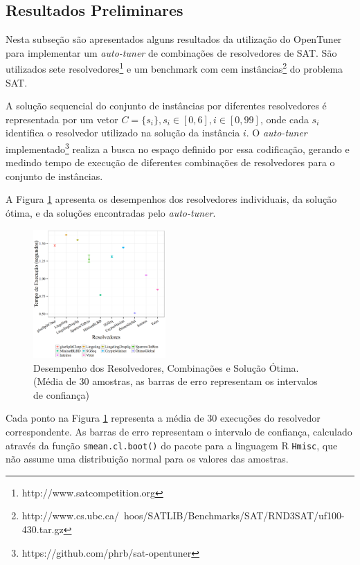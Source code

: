 \documentclass[a4paper, 12pt]{article}
\begin{document}
\subsection{Resultados Preliminares}

Nesta subseção são apresentados alguns resultados da utilização do OpenTuner
para implementar um \emph{auto-tuner} de combinações de resolvedores de
SAT. São utilizados sete resolvedores\footnote{http://www.satcompetition.org}
e um benchmark com cem
instâncias\footnote{http://www.cs.ubc.ca/~hoos/SATLIB/Benchmarks/SAT/RND3SAT/uf100-430.tar.gz}
do problema SAT.

A solução sequencial do conjunto de instâncias por diferentes resolvedores é
representada por um vetor $C = \{s_i\}, s_i \in [0,6], i \in [0,99]$, onde
cada $s_i$ identifica o resolvedor utilizado na solução da instância $i$.
O \emph{auto-tuner}
implementado\footnote{https://github.com/phrb/sat-opentuner} realiza a busca no
espaço definido por essa codificação, gerando e medindo tempo de execução de
diferentes combinações de resolvedores para o conjunto de instâncias.

A Figura \ref{fig:cmp_brute_tuned} apresenta os desempenhos dos resolvedores
individuais, da solução ótima, e da soluções encontradas
pelo \emph{auto-tuner}.

\begin{figure}[H]
    \centering
    \includegraphics[width=0.45\textwidth]{brute_tuned.eps}
    \captionsetup{width=0.6\textwidth}
    \caption{Desempenho dos Resolvedores, Combinações e Solução Ótima.
             (Média de 30 amostras, as barras de erro representam
             os intervalos de confiança)}
    \label{fig:cmp_brute_tuned}
\end{figure}

Cada ponto na Figura \ref{fig:cmp_brute_tuned} representa a média de 30
execuções do resolvedor correspondente. As barras de erro representam
o intervalo de confiança, calculado através da função \texttt{smean.cl.boot()}
do pacote para a linguagem R \texttt{Hmisc}, que não assume uma distribuição
normal para os valores das amostras.
\end{document}
